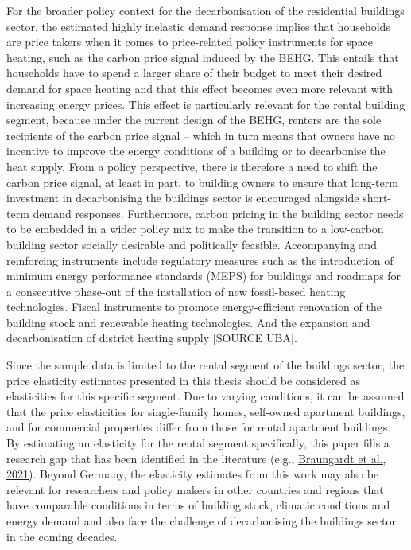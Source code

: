 \documentclass[12pt,twoside]{reedthesis}
\begin{document}
For the broader policy context for the decarbonisation of the residential buildings sector, the estimated highly inelastic demand response implies that households are price takers when it comes to price-related policy instruments for space heating, such as the carbon price signal induced by the BEHG. This entails that households have to spend a larger share of their budget to meet their desired demand for space heating and that this effect becomes even more relevant with increasing energy prices. This effect is particularly relevant for the rental building segment, because under the current design of the BEHG, renters are the sole recipients of the carbon price signal -- which in turn means that owners have no incentive to improve the energy conditions of a building or to decarbonise the heat supply. From a policy perspective, there is therefore a need to shift the carbon price signal, at least in part, to building owners to ensure that long-term investment in decarbonising the buildings sector is encouraged alongside short-term demand responses. Furthermore, carbon pricing in the building sector needs to be embedded in a wider policy mix to make the transition to a low-carbon building sector socially desirable and politically feasible. Accompanying and reinforcing instruments include regulatory measures such as the introduction of minimum energy performance standards (MEPS) for buildings and roadmaps for a consecutive phase-out of the installation of new fossil-based heating technologies. Fiscal instruments to promote energy-efficient renovation of the building stock and renewable heating technologies. And the expansion and decarbonisation of district heating supply {[}SOURCE UBA{]}.

Since the sample data is limited to the rental segment of the buildings sector, the price elasticity estimates presented in this thesis should be considered as elasticities for this specific segment. Due to varying conditions, it can be assumed that the price elasticities for single-family homes, self-owned apartment buildings, and for commercial properties differ from those for rental apartment buildings. By estimating an elasticity for the rental segment specifically, this paper fills a research gap that has been identified in the literature (e.g., \protect\hyperlink{ref-braungardt_etal21}{Braungardt et al., 2021}). Beyond Germany, the elasticity estimates from this work may also be relevant for researchers and policy makers in other countries and regions that have comparable conditions in terms of building stock, climatic conditions and energy demand and also face the challenge of decarbonising the buildings sector in the coming decades.
\end{document}
